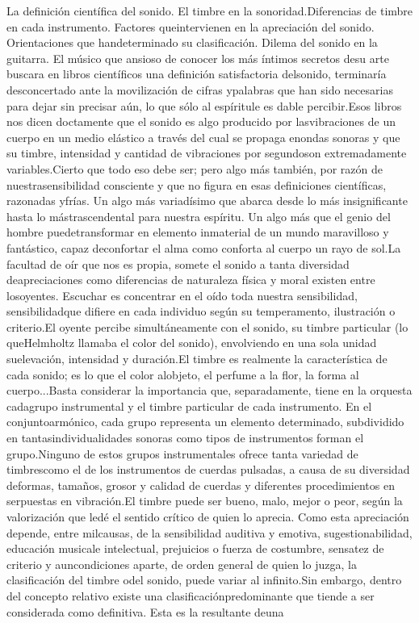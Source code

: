 \documentclass[
11pt, %
a4paper, %
oneside, %
headinclude,footinclude, %
BCOR5mm, %
]{scrartcl}
\begin{document}

\par{La definición científica del sonido. El timbre en la sonoridad.Diferencias de timbre en cada instrumento. Factores queintervienen en la apreciación del sonido. Orientaciones que handeterminado su clasificación. Dilema del sonido en la guitarra.
El músico que ansioso de conocer los más íntimos secretos desu arte buscara en libros científicos una definición satisfactoria delsonido, terminaría desconcertado ante la movilización de cifras ypalabras que han sido necesarias para dejar sin precisar aún, lo que sólo al espíritule es dable percibir.Esos libros nos dicen doctamente que el sonido es algo producido por lasvibraciones de un cuerpo en un medio elástico a través del cual se propaga enondas sonoras y que su timbre, intensidad y cantidad de vibraciones por segundoson extremadamente variables.Cierto que todo eso debe ser; pero algo más también, por razón de nuestrasensibilidad consciente y que no figura en esas definiciones científicas, razonadas yfrías. Un algo más variadísimo que abarca desde lo más insignificante hasta lo mástrascendental para nuestra espíritu. Un algo más que el genio del hombre puedetransformar en elemento inmaterial de un mundo maravilloso y fantástico, capaz deconfortar el alma como conforta al cuerpo un rayo de sol.La facultad de oír que nos es propia, somete el sonido a tanta diversidad deapreciaciones como diferencias de naturaleza física y moral existen entre losoyentes. Escuchar es concentrar en el oído toda nuestra sensibilidad, sensibilidadque difiere en cada individuo según su temperamento, ilustración o criterio.El oyente percibe simultáneamente con el sonido, su timbre particular (lo queHelmholtz llamaba el color del sonido), envolviendo en una sola unidad suelevación, intensidad y duración.El timbre es realmente la característica de cada sonido; es lo que el color alobjeto, el perfume a la flor, la forma al cuerpo...Basta considerar la importancia que, separadamente, tiene en la orquesta cadagrupo instrumental y el timbre particular de cada instrumento. En el conjuntoarmónico, cada grupo representa un elemento determinado, subdividido en tantasindividualidades sonoras como tipos de instrumentos forman el grupo.Ninguno de estos grupos instrumentales ofrece tanta variedad de timbrescomo el de los instrumentos de cuerdas pulsadas, a causa de su diversidad deformas, tamaños, grosor y calidad de cuerdas y diferentes procedimientos en serpuestas en vibración.El timbre puede ser bueno, malo, mejor o peor, según la valorización que ledé el sentido crítico de quien lo aprecia. Como esta apreciación depende, entre milcausas, de la sensibilidad auditiva y emotiva, sugestionabilidad, educación musicale intelectual, prejuicios o fuerza de costumbre, sensatez de criterio y auncondiciones aparte, de orden general de quien lo juzga, la clasificación del timbre odel sonido, puede variar al infinito.Sin embargo, dentro del concepto relativo existe una clasificaciónpredominante que tiende a ser considerada como definitiva. Esta es la resultante deuna }
\end{document}
